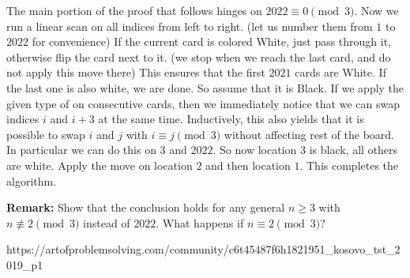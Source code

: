 {    The main portion of the proof that follows hinges on $2022 \equiv 0 \pmod 3$. Now we run a linear scan on all indices from left to right. (let us number them from $1$ to $2022$ for convenience)
    If the current card is colored White, just pass through it, otherwise flip the card next to it. (we stop when we reach the last card, and do not apply this move there)
    This ensures that the first $2021$ cards are White. If the last one is also white, we are done. So assume that it is Black. If we apply the given type of on consecutive cards, then we immediately notice that we can swap indices $i$ and $i+3$ at the same time. Inductively, this also yields that it is possible to swap $i$ and $j$ with $i \equiv j \pmod 3$ without affecting rest of the board. In particular we can do this on $3$ and $2022$. So now location $3$ is black, all others are white. Apply the move on location $2$ and then location $1$. This completes the algorithm.

    \textbf{Remark:} Show that the conclusion holds for any general $n \geqslant 3$ with $n \not \equiv 2 \pmod 3$ instead of $2022$. What happens if $n \equiv 2 \pmod 3$?
    }{%
    https://artofproblemsolving.com/community/c6t45487f6h1821951_kosovo_tst_2019_p1
}
